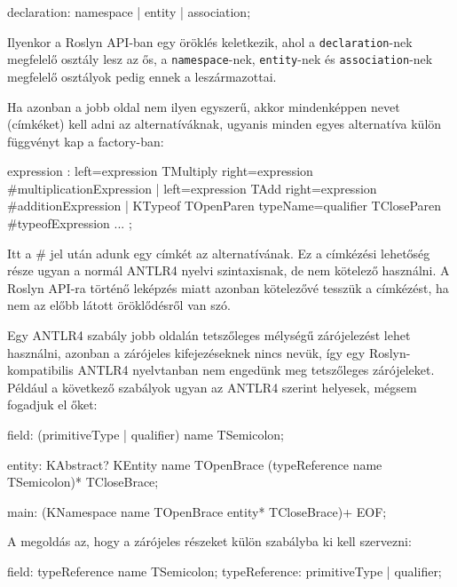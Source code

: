\documentclass[12pt, a4paper]{report}
\newcommand{\f}[1]{\texttt{#1}}
\begin{document}
\begin{antlr4code}
declaration: namespace | entity | association;
\end{antlr4code}

Ilyenkor a Roslyn API-ban egy öröklés keletkezik, ahol a \f{declaration}-nek megfelelő osztály lesz az ős, a \f{namespace}-nek, \f{entity}-nek és \f{association}-nek megfelelő osztályok pedig ennek a leszármazottai.

Ha azonban a jobb oldal nem ilyen egyszerű, akkor mindenképpen nevet (címkéket) kell adni az alternatíváknak, ugyanis minden egyes alternatíva külön függvényt kap a factory-ban:

\begin{antlr4code}
expression
	: left=expression TMultiply right=expression #multiplicationExpression
	| left=expression TAdd right=expression #additionExpression
	| KTypeof TOpenParen typeName=qualifier TCloseParen #typeofExpression
	...
	;
\end{antlr4code}

Itt a \# jel után adunk egy címkét az alternatívának. Ez a címkézési lehetőség része ugyan a normál ANTLR4 nyelvi szintaxisnak, de nem kötelező használni. A Roslyn API-ra történő leképzés miatt azonban kötelezővé tesszük a címkézést, ha nem az előbb látott öröklődésről van szó.

Egy ANTLR4 szabály jobb oldalán tetszőleges mélységű zárójelezést lehet használni, azonban a zárójeles kifejezéseknek nincs nevük, így egy Roslyn-kompatibilis ANTLR4 nyelvtanban nem engedünk meg tetszőleges zárójeleket. Például a következő szabályok ugyan az ANTLR4 szerint helyesek, mégsem fogadjuk el őket:

\begin{antlr4code}
field: (primitiveType | qualifier) name TSemicolon;
\end{antlr4code}

\begin{antlr4code}
entity: KAbstract? KEntity name TOpenBrace (typeReference name TSemicolon)* TCloseBrace;
\end{antlr4code}

\begin{antlr4code}
main: (KNamespace name TOpenBrace entity* TCloseBrace)+ EOF;
\end{antlr4code}

A megoldás az, hogy a zárójeles részeket külön szabályba ki kell szervezni:

\begin{antlr4code}
field: typeReference name TSemicolon;
typeReference: primitiveType | qualifier;
\end{antlr4code}
\end{document}
